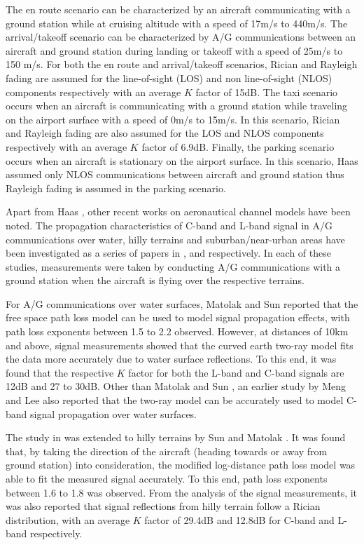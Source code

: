 The en route scenario can be characterized by an aircraft communicating with a ground station while at cruising altitude with a speed of 17m/s to 440m/s. The arrival/takeoff scenario can be characterized by A/G communications between an aircraft and ground station during landing or takeoff with a speed of 25m/s to 150 m/s. For both the en route and arrival/takeoff scenarios, Rician and Rayleigh fading are assumed for the line-of-sight (LOS) and non line-of-sight (NLOS) components respectively with an average $K$ factor of 15dB. The taxi scenario occurs when an aircraft is communicating with a ground station while traveling on the airport surface with a speed of 0m/s to 15m/s. In this scenario, Rician and Rayleigh fading are also assumed for the LOS and NLOS components respectively with an average $K$ factor of 6.9dB. Finally, the parking scenario occurs when an aircraft is stationary on the airport surface. In this scenario, Haas \cite{haas2002aeronautical} assumed only NLOS communications between aircraft and ground station thus Rayleigh fading is assumed in the parking scenario.

Apart from Haas \cite{haas2002aeronautical}, other recent works on aeronautical channel models have been noted. The propagation characteristics of C-band and L-band signal in A/G communications over water, hilly terrains and suburban/near-urban areas have been investigated as a series of papers in \cite{matolak2017air_water},\cite{sun2017air_hilly} and \cite{matolak2017air_suburban} respectively. In each of these studies, measurements were taken by conducting A/G communications with a ground station when the aircraft is flying over the respective terrains. 

For A/G communications over water surfaces, Matolak and Sun \cite{matolak2017air_water} reported that the free space path loss model can be used to model signal propagation effects, with path loss exponents between 1.5 to 2.2 observed. However, at distances of 10km and above, signal measurements showed that the curved earth two-ray model fits the data more accurately due to water surface reflections. To this end, it was found that the respective $K$ factor for both the L-band and C-band signals are 12dB and 27 to 30dB. Other than Matolak and Sun \cite{matolak2017air_water}, an earlier study by Meng and Lee \cite{meng2011measurements} also reported that the two-ray model can be accurately used to model C-band signal propagation over water surfaces.

The study in \cite{matolak2017air_water} was extended to hilly terrains by Sun and Matolak \cite{sun2017air_hilly}. It was found that, by taking the direction of the aircraft (heading towards or away from ground station) into consideration, the modified log-distance path loss model was able to fit the measured signal accurately. To this end, path loss exponents between 1.6 to 1.8 was observed. From the analysis of the signal measurements, it was also reported that signal reflections from hilly terrain follow a Rician distribution, with an average $K$ factor of 29.4dB and 12.8dB for C-band and L-band respectively.

